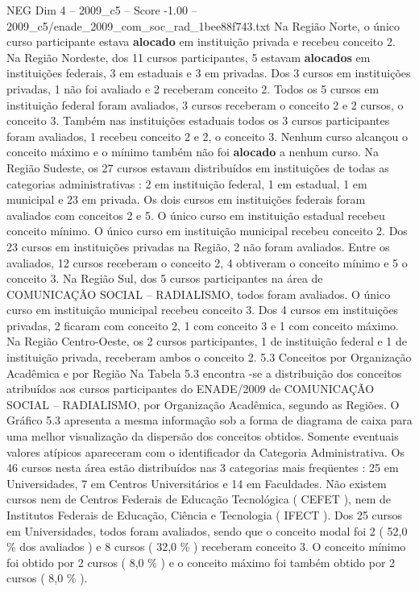 \begin{textsample}{NEG Dim 4 – 2009\_c5 – Score -1.00 – 2009\_c5/enade\_2009\_com\_soc\_rad\_1bee88f743.txt}
Na Região Norte, o único curso participante estava \textbf{alocado} em instituição privada e recebeu conceito 2.
Na Região Nordeste, dos 11 cursos participantes, 5 estavam \textbf{alocados} em instituições federais, 3 em estaduais e 3 em privadas.
Dos 3 cursos em instituições privadas, 1 não foi avaliado e 2 receberam conceito 2.
Todos os 5 cursos em instituição federal foram avaliados, 3 cursos receberam o conceito 2 e 2 cursos, o conceito 3.
Também nas instituições estaduais todos os 3 cursos participantes foram avaliados, 1 recebeu conceito 2 e 2, o conceito 3.
Nenhum curso alcançou o conceito máximo e o mínimo também não foi \textbf{alocado} a nenhum curso.
Na Região Sudeste, os 27 cursos estavam distribuídos em instituições de todas as categorias administrativas : 2 em instituição federal, 1 em estadual, 1 em municipal e 23 em privada.
Os dois cursos em instituições federais foram avaliados com conceitos 2 e 5.
O único curso em instituição estadual recebeu conceito mínimo.
O único curso em instituição municipal recebeu conceito 2.
Dos 23 cursos em instituições privadas na Região, 2 não foram avaliados.
Entre os avaliados, 12 cursos receberam o conceito 2, 4 obtiveram o conceito mínimo e 5 o conceito 3.
Na Região Sul, dos 5 cursos participantes na área de COMUNICAÇÃO SOCIAL – RADIALISMO, todos foram avaliados.
O único curso em instituição municipal recebeu conceito 3.
Dos 4 cursos em instituições privadas, 2 ficaram com conceito 2, 1 com conceito 3 e 1 com conceito máximo.
Na Região Centro-Oeste, os 2 cursos participantes, 1 de instituição federal e 1 de instituição privada, receberam ambos o conceito 2. 5.3 Conceitos por Organização Acadêmica e por Região Na Tabela 5.3 encontra -se a distribuição dos conceitos atribuídos aos cursos participantes do ENADE/2009 de COMUNICAÇÃO SOCIAL – RADIALISMO, por Organização Acadêmica, segundo as Regiões.
O Gráfico 5.3 apresenta a mesma informação sob a forma de diagrama de caixa para uma melhor visualização da dispersão dos conceitos obtidos.
Somente eventuais valores atípicos apareceram com o identificador da Categoria Administrativa.
Os 46 cursos nesta área estão distribuídos nas 3 categorias mais freqüentes : 25 em Universidades, 7 em Centros Universitários e 14 em Faculdades.
Não existem cursos nem de Centros Federais de Educação Tecnológica ( CEFET ), nem de Institutos Federais de Educação, Ciência e Tecnologia ( IFECT ).
Dos 25 cursos em Universidades, todos foram avaliados, sendo que o conceito modal foi 2 ( 52,0 \% dos avaliados ) e 8 cursos ( 32,0 \% ) receberam conceito 3.
O conceito mínimo foi obtido por 2 cursos ( 8,0 \% ) e o conceito máximo foi também obtido por 2 cursos ( 8,0 \% ).

\end{textsample}
